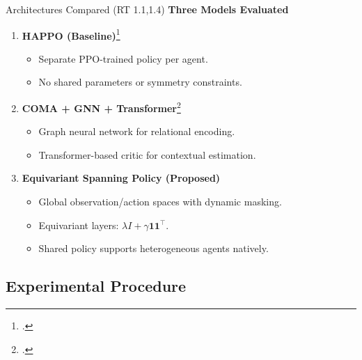\begin{frame}{Architectures Compared (RT 1.1,1.4)}
    \textbf{Three Models Evaluated}
    \begin{enumerate}
        \item \textbf{HAPPO (Baseline)}\footcite{zhong2024}
            \begin{itemize}
                \item Separate PPO-trained policy per agent.
                \item No shared parameters or symmetry constraints.
            \end{itemize}
        \item \textbf{COMA + GNN + Transformer}\footcite{liu2020b}
            \begin{itemize}
                \item Graph neural network for relational encoding.
                \item Transformer-based critic for contextual estimation.
            \end{itemize}
        \item \textbf{Equivariant Spanning Policy (Proposed)}
            \begin{itemize}
                \item Global observation/action spaces with dynamic masking.
                \item Equivariant layers: \(\lambda I + \gamma \mathbf{11}^\top\).
                \item Shared policy supports heterogeneous agents natively.
            \end{itemize}
    \end{enumerate}
\end{frame}



\subsection{Experimental Procedure}

